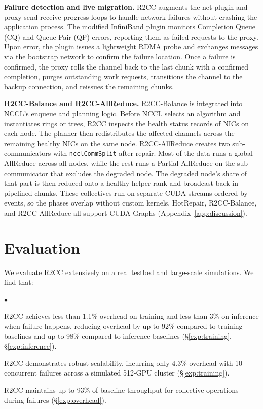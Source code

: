 \documentclass[letterpaper,twocolumn,10pt]{article}
\newenvironment{packeditemize}{
\begin{list}{$\bullet$}{
\setlength{\itemsep}{1.5pt}
\setlength{\labelwidth}{8pt}
\setlength{\leftmargin}{10pt}
\setlength{\labelsep}{3pt}
\setlength{\listparindent}{\parindent}
\setlength{\parsep}{1.5pt}
\setlength{\parskip}{1.5pt}
\setlength{\topsep}{1.5pt}}}{\end{list}}
\begin{document}
\smallskip\noindent\textbf{Failure detection and live migration.}
R2CC augments the net plugin and proxy send receive progress loops to handle network failures without crashing the application process. The modified InfiniBand plugin monitors Completion Queue (CQ) and Queue Pair (QP) errors, reporting them as failed requests to the proxy. Upon error, the plugin issues a lightweight RDMA probe and exchanges messages via the bootstrap network to confirm the failure location. Once a failure is confirmed, the proxy rolls the channel back to the last chunk with a confirmed completion, purges outstanding work requests, transitions the channel to the backup connection, and reissues the remaining chunks.

\smallskip\noindent\textbf{R2CC-Balance and R2CC-AllReduce.}
R2CC-Balance is integrated into NCCL's enqueue and planning logic. Before NCCL selects an algorithm and instantiates rings or trees, R2CC inspects the health status records of NICs on each node. The planner then redistributes the affected channels across the remaining healthy NICs on the same node. R2CC-AllReduce creates two sub-communicators with \texttt{ncclCommSplit} after repair. Most of the data runs a global AllReduce across all nodes, while the rest runs a Partial AllReduce on the sub-communicator that excludes the degraded node. The degraded node's share of that part is then reduced onto a healthy helper rank and broadcast back in pipelined chunks. These collectives run on separate CUDA streams ordered by events, so the phases overlap without custom kernels. HotRepair, R2CC-Balance, and R2CC-AllReduce all support CUDA Graphs (Appendix~\ref{app:discussion}).




\section{Evaluation}

We evaluate R2CC extensively on a real testbed and large-scale simulations. We find that:
\begin{packeditemize}
    \item R2CC achieves less than 1.1\% overhead on training and less than 3\% on inference when failure happens, reducing overhead by up to 92\% compared to training baselines and up to 98\% compared to inference baselines (§\ref{exp:training}, §\ref{exp:inference}).
    \item R2CC demonstrates robust scalability, incurring only 4.3\% overhead with 10 concurrent failures across a simulated 512-GPU cluster (§\ref{exp:training}).
    \item R2CC maintains up to 93\% of baseline throughput for collective operations during failures (§\ref{exp:overhead}).
\end{packeditemize}
\end{document}
